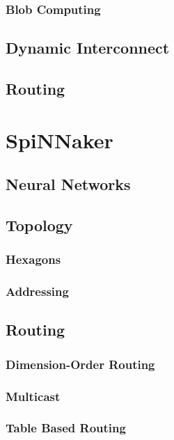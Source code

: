 \documentclass[a4paper,11pt,titlepage]{report}
\begin{document}
					\subsubsection{Blob Computing}
				
				\subsection{Dynamic Interconnect}
				
				\subsection{Routing}
		
		\section{SpiNNaker}
			
			\subsection{Neural Networks}
			
			\subsection{Topology}
				
				\subsubsection{Hexagons}
				
				\subsubsection{Addressing}
			
			\subsection{Routing}
				
				\subsubsection{Dimension-Order Routing}
				
				\subsubsection{Multicast}
				
				\subsubsection{Table Based Routing}
			
\end{document}
